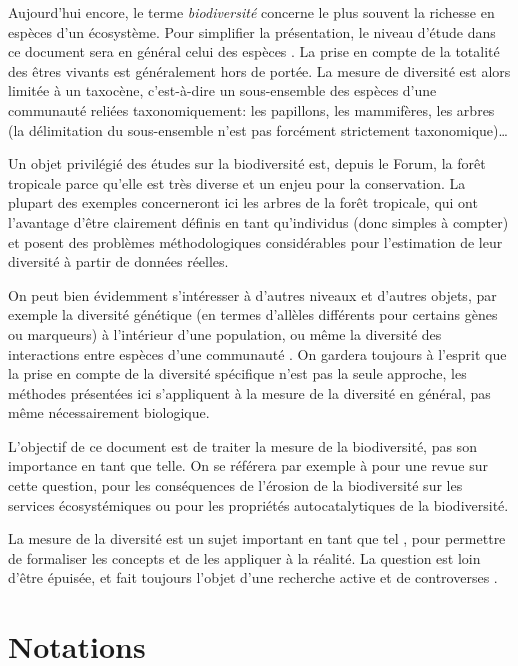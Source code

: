 \documentclass[
  11pt,
  french,
  a4paper,
  extrafontsizes,onecolumn,openright
  ]{memoir}
\begin{document}
Aujourd'hui encore, le terme \emph{biodiversité} concerne le plus souvent la richesse en espèces d'un écosystème.
Pour simplifier la présentation, le niveau d'étude dans ce document sera en général celui des espèces \autocite[autre concept flou,][]{Hey2001}.
La prise en compte de la totalité des êtres vivants est généralement hors de portée.
La mesure de diversité est alors limitée à un taxocène, c'est-à-dire un sous-ensemble des espèces d'une communauté reliées taxonomiquement: les papillons, les mammifères, les arbres (la délimitation du sous-ensemble n'est pas forcément strictement taxonomique)\ldots{}

Un objet privilégié des études sur la biodiversité est, depuis le Forum, la forêt tropicale parce qu'elle est très diverse et un enjeu pour la conservation.
La plupart des exemples concerneront ici les arbres de la forêt tropicale, qui ont l'avantage d'être clairement définis en tant qu'individus (donc simples à compter) et posent des problèmes méthodologiques considérables pour l'estimation de leur diversité à partir de données réelles.

On peut bien évidemment s'intéresser à d'autres niveaux et d'autres objets, par exemple la diversité génétique (en termes d'allèles différents pour certains gènes ou marqueurs) à l'intérieur d'une population, ou même la diversité des interactions entre espèces d'une communauté \autocite{Jizhong1991}.
On gardera toujours à l'esprit que la prise en compte de la diversité spécifique n'est pas la seule approche, les méthodes présentées ici s'appliquent à la mesure de la diversité en général, pas même nécessairement biologique.

L'objectif de ce document est de traiter la mesure de la biodiversité, pas son importance en tant que telle.
On se référera par exemple à \textcite{Chapin2000} pour une revue sur cette question, \textcite{Cardinale2012} pour les conséquences de l'érosion de la biodiversité sur les services écosystémiques ou \textcite{Ceballos2017} pour les propriétés autocatalytiques de la biodiversité.

La mesure de la diversité est un sujet important en tant que tel \autocite{Purvis2000}, pour permettre de formaliser les concepts et de les appliquer à la réalité.
La question est loin d'être épuisée, et fait toujours l'objet d'une recherche active et de controverses \autocite{Ricotta2005b}.

\hypertarget{notations}{%
\chapter*{Notations}\label{notations}}
\end{document}
